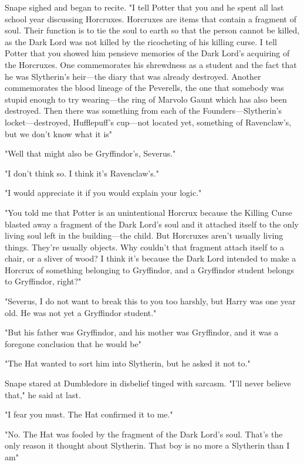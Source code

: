 Snape sighed and began to recite. "I tell Potter that you and he spent all last school year discussing Horcruxes. Horcruxes are items that contain a fragment of soul. Their function is to tie the soul to earth so that the person cannot be killed, as the Dark Lord was not killed by the ricocheting of his killing curse. I tell Potter that you showed him pensieve memories of the Dark Lord's acquiring of the Horcruxes. One commemorates his shrewdness as a student and the fact that he was Slytherin's heir—the diary that was already destroyed. Another commemorates the blood lineage of the Peverells, the one that somebody was stupid enough to try wearing—the ring of Marvolo Gaunt which has also been destroyed. Then there was something from each of the Founders—Slytherin's locket—destroyed, Hufflepuff's cup—not located yet, something of Ravenclaw's, but we don't know what it is{\el}"

"Well that might also be Gryffindor's, Severus."

"I don't think so. I think it's Ravenclaw's."

"I would appreciate it if you would explain your logic."

"You told me that Potter is an unintentional Horcrux because the Killing Curse blasted away a fragment of the Dark Lord's soul and it attached itself to the only living soul left in the building—the child. But Horcruxes aren't usually living things. They're usually objects. Why couldn't that fragment attach itself to a chair, or a sliver of wood? I think it's because the Dark Lord intended to make a Horcrux of something belonging to Gryffindor, and a Gryffindor student belongs to Gryffindor, right?"

"Severus, I do not want to break this to you too harshly, but Harry was one year old. He was not yet a Gryffindor student."

"But his father was Gryffindor, and his mother was Gryffindor, and it was a foregone conclusion that he would be{\el}"

"The Hat wanted to sort him into Slytherin, but he asked it not to."

Snape stared at Dumbledore in disbelief tinged with sarcasm. "I'll never believe that," he said at last.

"I fear you must. The Hat confirmed it to me."

"No. The Hat was fooled by the fragment of the Dark Lord's soul. That's the only reason it thought about Slytherin. That boy is no more a Slytherin than I am{\el}"


